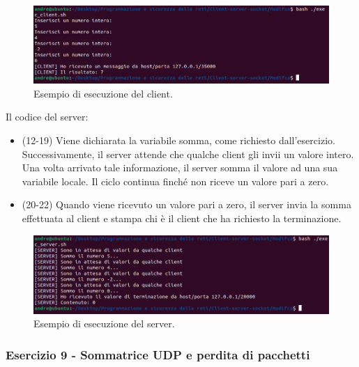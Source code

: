 \documentclass[a4paper]{article}
\begin{document}
	\noindent
	\begin{figure}[!htp]
		\centering
		\includegraphics[width=\textwidth]{img/soluzioni_TCP-UDP/TCP-UDP_3.png}
		\caption{Esempio di esecuzione del client.}
	\end{figure}

	\noindent
	Il codice del server:
	
	\begin{itemize}
		\item (12-19) Viene dichiarata la variabile somma, come richiesto dall'esercizio. Successivamente, il server attende che qualche client gli invii un valore intero. Una volta arrivato tale informazione, il server somma il valore ad una sua variabile locale. Il ciclo continua finché non riceve un valore pari a zero.
		
		\item (20-22) Quando viene ricevuto un valore pari a zero, il server invia la somma effettuata al client e stampa chi è il client che ha richiesto la terminazione.
	\end{itemize}\newpage

	\noindent
	\begin{figure}[!htp]
		\centering
		\includegraphics[width=\textwidth]{img/soluzioni_TCP-UDP/TCP-UDP_4.png}
		\caption{Esempio di esecuzione del server.}
	\end{figure}\newpage

	\subsubsection{Esercizio 9 - Sommatrice UDP e perdita di pacchetti}\label{esercizio 9 - Sommatrice UDP e perdita di pacchetti}
	
\end{document}
